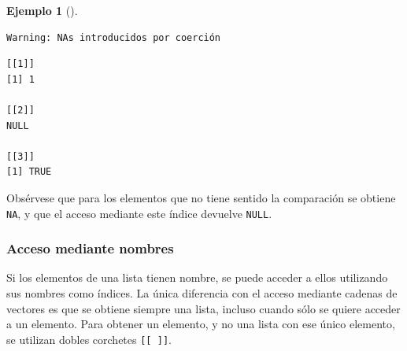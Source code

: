 \documentclass[
  a4paper,
]{scrreport}
\theoremstyle{definition}
\theoremstyle{definition}
\newtheorem{example}{Ejemplo}[chapter]
\theoremstyle{remark}
\begin{document}
\begin{example}[]
\begin{verbatim}
Warning: NAs introducidos por coerción
\end{verbatim}

\begin{verbatim}
[[1]]
[1] 1

[[2]]
NULL

[[3]]
[1] TRUE
\end{verbatim}

Obsérvese que para los elementos que no tiene sentido la comparación se
obtiene \texttt{NA}, y que el acceso mediante este índice devuelve
\texttt{NULL}.

\end{example}

\hypertarget{acceso-mediante-nombres}{%
\subsubsection{Acceso mediante nombres}\label{acceso-mediante-nombres}}

Si los elementos de una lista tienen nombre, se puede acceder a ellos
utilizando sus nombres como índices. La única diferencia con el acceso
mediante cadenas de vectores es que se obtiene siempre una lista,
incluso cuando sólo se quiere acceder a un elemento. Para obtener un
elemento, y no una lista con ese único elemento, se utilizan dobles
corchetes \texttt{{[}{[}\ {]}{]}}.
\end{document}
